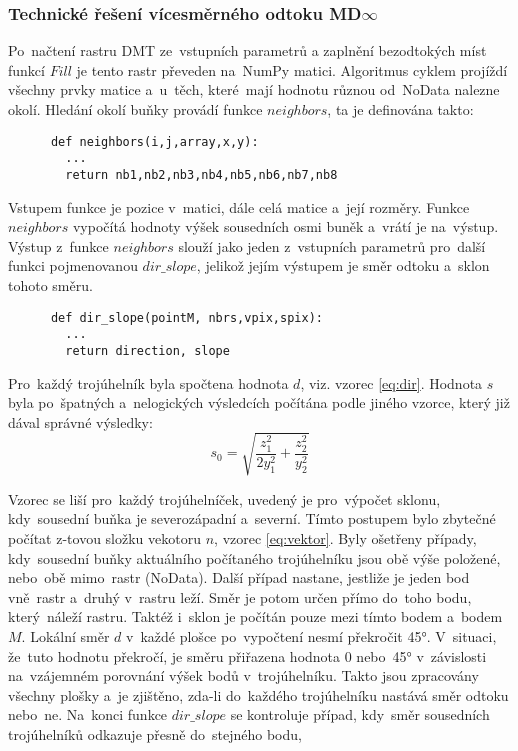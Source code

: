 \subsubsection{Technické řešení vícesměrného odtoku MD\texorpdfstring{$\infty$}{infty}} \label{subsection:MDtechicke}
Po~načtení rastru DMT ze~vstupních parametrů a zaplnění bezodtokých míst funkcí $Fill$ je tento rastr převeden na~NumPy matici. 
Algoritmus cyklem projíždí všechny prvky matice a~u~těch, které~mají hodnotu různou od~NoData nalezne okolí. Hledání okolí buňky provádí funkce $neighbors$, ta je definována takto:
\begin{lstlisting}
	  def neighbors(i,j,array,x,y):
	    ...
	    return nb1,nb2,nb3,nb4,nb5,nb6,nb7,nb8
\end{lstlisting}
Vstupem funkce je pozice v~matici, dále celá matice a~její rozměry. Funkce $neighbors$ vypočítá hodnoty výšek sousedních osmi buněk a~vrátí je na~výstup. 
Výstup z~funkce $neighbors$ slouží jako jeden z~vstupních parametrů pro~další funkci pojmenovanou $dir\_slope$, jelikož jejím výstupem je směr odtoku a~sklon tohoto směru. 
\begin{lstlisting}
	  def dir_slope(pointM, nbrs,vpix,spix):
	    ...
	    return direction, slope
\end{lstlisting}
Pro~každý trojúhelník byla spočtena hodnota $d$, viz. vzorec \ref{eq:dir}. Hodnota $s$ byla po~špatných a~nelogických výsledcích počítána podle jiného vzorce, který již dával správné výsledky:
\begin{equation}
 s_0 = \sqrt{\frac{z_1^2}{2y_1^2} + \frac{z_2^2}{y_2^2}} \label{eq:slopeOprava}
\end{equation}  
\par Vzorec se liší pro~každý trojúhelníček, uvedený je pro~výpočet sklonu, kdy~sousední buňka je severozápadní a~severní. Tímto postupem bylo zbytečné počítat z-tovou složku vekotoru $n$, vzorec \ref{eq:vektor}.
Byly ošetřeny případy, kdy~sousední buňky aktuálního počítaného trojúhelníku jsou obě výše položené, nebo~obě mimo~rastr (NoData). Další případ nastane, jestliže je jeden bod vně~rastr a~druhý v~rastru leží.
Směr je potom určen přímo do~toho bodu, který~náleží rastru. Taktéž i~sklon je počítán pouze mezi tímto bodem a~bodem $M$. Lokální směr $d$ v~každé plošce po~vypočtení nesmí překročit 45°. 
V~situaci, že~tuto hodnotu překročí, je směru přiřazena hodnota 0 nebo~45° v~závislosti na~vzájemném porovnání výšek bodů v~trojúhelníku. Takto jsou zpracovány všechny plošky a~je zjištěno,
zda-li do~každého trojúhelníku nastává směr odtoku nebo~ne. Na~konci funkce $dir\_slope$ se kontroluje případ, kdy~směr sousedních trojúhelníků odkazuje přesně do~stejného bodu,
